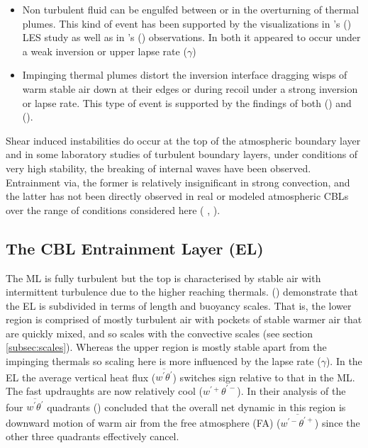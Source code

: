 \begin{itemize}

\item{Non turbulent fluid can be engulfed between or in the overturning of thermal plumes. This kind of event has been supported by the visualizations in \citeauthor{SullMoengStev}'s (\citeyear{SullMoengStev}) \acs{LES} study as well as in \citeauthor{Traum11}'s (\citeyear{Traum11}) observations. In both it appeared to occur under a weak inversion or upper lapse rate ($\gamma$)}

\item{
Impinging thermal plumes distort the inversion interface dragging wisps of warm stable air down at their edges or during recoil under a strong inversion or lapse rate. This type of event is supported by the findings  of both \citeauthor{SullMoengStev} (\citeyear{SullMoengStev}) and \citeauthor{Traum11} (\citeyear{Traum11}).}

\end{itemize}

Shear induced instabilities do occur at the top of the atmospheric boundary layer and in some laboratory studies of turbulent boundary layers, under conditions of very high stability, the breaking of internal waves have been observed.  Entrainment via, the former is relatively insignificant in strong convection, and the latter has not been directly observed in real or modeled atmospheric \acs{CBL}s over the range of conditions considered here (\citeauthor{Traum11} \citeyear{Traum11}, \citeauthor{SullMoengStev} \citeyear{SullMoengStev}).

\subsection{The CBL Entrainment Layer (EL)}
\label{subsec:}

The \acs{ML} is fully turbulent but the top is characterised by stable air with intermittent turbulence due to the higher reaching thermals. \citeauthor{GarciaMellado} (\citeyear{GarciaMellado}) demonstrate that the \acs{EL} is subdivided in terms of length and buoyancy scales.  That is, the lower region is comprised of mostly turbulent air with pockets of stable warmer air that are quickly mixed, and so scales with the convective scales (see section \ref{subsec:scales}). Whereas the upper region is mostly stable apart from the impinging thermals so scaling here is more influenced by the lapse rate ($\gamma$).  In the \acs{EL} the average vertical heat flux ($\overline{w^{'}\theta^{'}}$) switches sign relative to that in the \acs{ML}.  The fast updraughts are now relatively cool ($w^{'+}\theta^{'-}$).  In their analysis of the four $\overline{w^{'}\theta^{'}}$ quadrants \citeauthor{SullMoengStev} (\citeyear{SullMoengStev}) concluded that the overall net dynamic in this region is downward motion of warm air from the free atmosphere (\acs{FA}) ($\overline{w^{'-}\theta^{'+}}$) since the other three quadrants effectively cancel.\\

